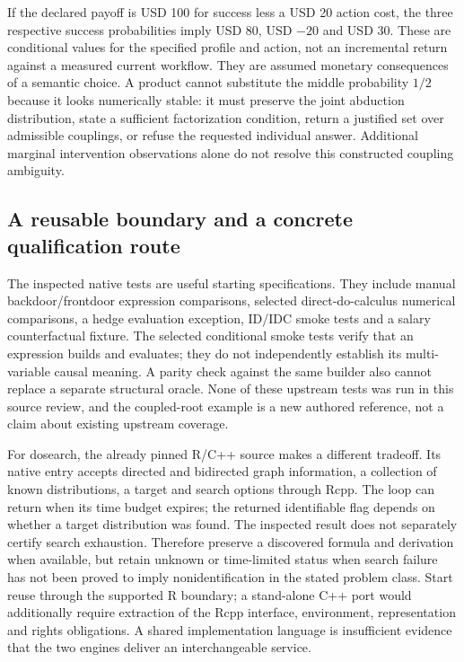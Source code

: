 If the declared payoff is USD 100 for success less a USD 20 action cost, the
three respective success probabilities imply USD 80, USD $-20$ and USD 30.
These are conditional values for the specified profile and action, not an
incremental return against a measured current workflow. They are assumed
monetary consequences of a semantic choice. A product cannot substitute the
middle probability $1/2$ because it looks numerically stable: it must preserve
the joint abduction distribution, state a sufficient factorization condition,
return a justified set over admissible couplings, or refuse the requested
individual answer. Additional marginal intervention observations alone do not
resolve this constructed coupling ambiguity.
\citep{exec19_cxx_identification_reference}

\subsection{A reusable boundary and a concrete qualification route}
\label{exec19:cxxid-contract}
The inspected native tests are useful starting specifications. They include
manual backdoor/frontdoor expression comparisons, selected direct-do-calculus
numerical comparisons, a hedge evaluation exception, ID/IDC smoke tests and a
salary counterfactual fixture. The selected conditional smoke tests verify that
an expression builds and evaluates; they do not independently establish its
multi-variable causal meaning. A parity check against the same builder also
cannot replace a separate structural oracle. None of these upstream tests was
run in this source review, and the coupled-root example is a new authored
reference, not a claim about existing upstream coverage.
\citep{exec19_cxx_identification_source,exec19_cxx_identification_reference}

For dosearch, the already pinned R/C++ source makes a different tradeoff. Its
native entry accepts directed and bidirected graph information, a collection
of known distributions, a target and search options through Rcpp. The loop can
return when its time budget expires; the returned identifiable flag depends
on whether a target distribution was found. The inspected result does not
separately certify search exhaustion. Therefore preserve a discovered formula
and derivation when available, but retain unknown or time-limited status when
search failure has not been proved to imply nonidentification in the stated
problem class. Start reuse through the supported R boundary; a stand-alone C++
port would additionally require extraction of the Rcpp interface, environment,
representation and rights obligations. A shared implementation language is
insufficient evidence that the two engines deliver an interchangeable service.
\citep{exec18_rid_dosearch}

